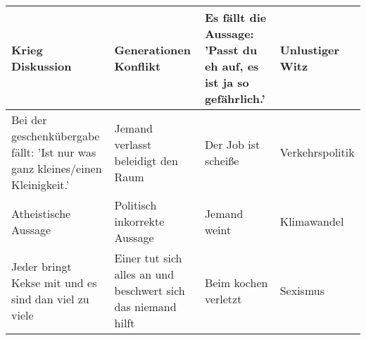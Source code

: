 \begin{table}[h]
\begin{tabularx}{\linewidth}{|X|X|X|X|}
\hline
Krieg Diskussion & Generationen Konflikt & Es fällt die Aussage: 'Passt du eh auf, es ist ja so gefährlich.' & Unlustiger Witz \\ \hline
Bei der geschenkübergabe fällt: 'Ist nur was ganz kleines/einen Kleinigkeit.' & Jemand verlasst beleidigt den Raum & Der Job ist scheiße & Verkehrspolitik \\ \hline
Atheistische Aussage & Politisch inkorrekte Aussage & Jemand weint & Klimawandel \\ \hline
Jeder bringt Kekse mit und es sind dan viel zu viele & Einer tut sich alles an und beschwert sich das niemand hilft & Beim kochen verletzt & Sexismus \\ \hline
\end{tabularx}
\end{table}
